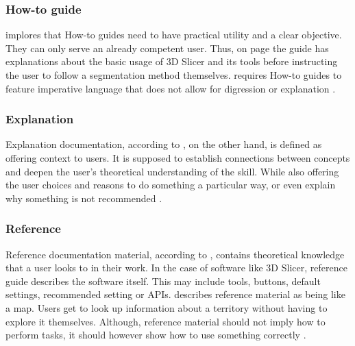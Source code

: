 \subsubsection*{How-to guide}
\citeauthor{procidaDiataxisDocumentationFramework2023} implores that How-to guides need to have practical utility and a clear objective.
They can only serve an already competent user.
Thus, on page \pageref{a:guide} the guide has explanations about the basic usage of 3D Slicer and its tools before instructing the user to follow a segmentation method themselves.
\citeauthor{procidaDiataxisDocumentationFramework2023} requires How-to guides to feature imperative language that does not allow for digression or explanation \cite{procidaPythonDocsCommunity2022,procidaDiataxisDocumentationFramework2023}.

\subsubsection*{Explanation}
Explanation documentation, according to \citeauthor{procidaDiataxisDocumentationFramework2023}, on the other hand, is defined as offering context to users.
It is supposed to establish connections between concepts and deepen the user's theoretical understanding of the skill.
While also offering the user choices and reasons to do something a particular way, or even explain why something is not recommended \cite{procidaPythonDocsCommunity2022,procidaDiataxisDocumentationFramework2023}.

\subsubsection*{Reference}
Reference documentation material, according to \citeauthor{procidaDiataxisDocumentationFramework2023}, contains theoretical knowledge that a user looks to in their work.
In the case of software like 3D Slicer, reference guide describes the software itself.
This may include tools, buttons, default settings, recommended setting or APIs.
\citeauthor{procidaDiataxisDocumentationFramework2023} describes reference material as being like a map.
Users get to look up information about a territory without having to explore it themselves.
Although, reference material should not imply how to perform tasks, it should however show how to use something correctly \cite{procidaPythonDocsCommunity2022,procidaDiataxisDocumentationFramework2023}.


